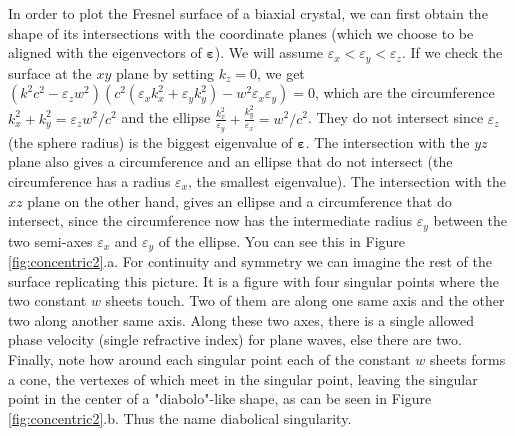 \documentclass[11pt, a4paper, twoside]{article} %
\begin{document}
In order to plot the Fresnel surface of a biaxial crystal, we can first obtain the shape of its intersections with the coordinate planes (which we choose to be aligned with the eigenvectors of $\pmb{\varepsilon}$). We will assume $\varepsilon_x<\varepsilon_y<\varepsilon_z$. If we check the surface at the $xy$ plane by setting $k_z=0$, we get $(k^2c^2-\varepsilon_zw^2)(c^2(\varepsilon_xk_x^2+\varepsilon_yk_y^2)-w^2\varepsilon_x\varepsilon_y)=0$, which are the circumference $k_x^2+k_y^2=\varepsilon_zw^2/c^2$ and the ellipse $\frac{k_x^2}{\varepsilon_y}+\frac{k_y^2}{\varepsilon_x}=w^2/c^2$. They do not intersect since $\varepsilon_z$ (the sphere radius) is the biggest eigenvalue of $\pmb{\varepsilon}$. The intersection with the $yz$ plane also gives a circumference and an ellipse that do not intersect (the circumference has a radius $\varepsilon_x$, the smallest eigenvalue). The intersection with the $xz$ plane on the other hand, gives an ellipse and a circumference that do intersect, since the circumference now has the intermediate radius $\varepsilon_y$ between the two semi-axes $\varepsilon_x$ and $\varepsilon_y$ of the ellipse. You can see this in Figure \ref{fig:concentric2}.a. For continuity and symmetry we can imagine the rest of the surface replicating this picture. It is a figure with four singular points where the two constant $w$ sheets touch. Two of them are along one same axis and the other two along another same axis. Along these two axes, there is a single allowed phase velocity (single refractive index) for plane waves, else there are two. Finally, note how around each singular point each of the constant $w$ sheets forms a cone, the vertexes of which meet in the singular point, leaving the singular point in the center of a "diabolo"-like shape, as can be seen in Figure \ref{fig:concentric2}.b. Thus the name diabolical singularity.\vspace{-0.15cm}
\end{document}
